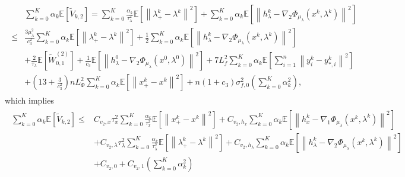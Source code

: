 \documentclass[10pt]{article}
\theoremstyle{remark}
\newcommand{\E}{\mathbb{E}}
\newcommand{\norm}[1]{\left\|#1\right\|}
\begin{document}
\begin{align}\label{ineq: tildeV_lam}
    \begin{aligned}
        &\sum_{k=0}^{K}\alpha_k\E\left[\tilde V_{k,2}\right] = \sum_{k=0}^{K}\frac{\alpha_k}{\tau_{\lambda}^2}\E\left[\norm{\lambda_+^k - \lambda^k}^2\right] + \sum_{k=0}^{K}\alpha_k\E\left[\norm{h_{\lambda}^k - \nabla_2\Phi_{\mu_{\lambda}}(x^k, \lambda^k)}^2\right]\\
        \leq & \frac{3\mu_{\lambda}^2}{c_3^2}\sum_{k=0}^{K}\alpha_k\E\left[\norm{\lambda_+^k - \lambda^k}^2\right] + \frac{1}{2}\sum_{k=0}^{K}\alpha_k\E\left[\norm{h_{\lambda}^k - \nabla_2\Phi_{\mu_{\lambda}}(x^k, \lambda^k)}^2\right] \\
        &+ \frac{2}{\tau_{\lambda}}\E\left[\tilde W_{0,1}^{(2)}\right] + \frac{1}{c_3}\E\left[\norm{h_{\lambda}^0 - \nabla_2\Phi_{\mu_{\lambda}}(x^0, \lambda^0)}^2\right] + 7L_f^2\sum_{k=0}^{K}\alpha_k\E\left[\sum_{i=1}^{n}\norm{y_i^k-y_{*,i}^k}^2\right] \\
        &+ \left(13 + \frac{3}{c_3^2}\right)nL_{\Phi}^2\sum_{k=0}^{K}\alpha_k\E\left[\norm{x_+^k - x^k}^2\right] + n(1 + c_3)\sigma_{f,0}^2\left(\sum_{k=0}^{K}\alpha_k^2\right),
    \end{aligned}
\end{align}
which implies
\begin{align}\label{ineq: tildeV_2_final}
    \begin{aligned}
        \sum_{k=0}^{K}\alpha_k\E\left[\tilde V_{k,2}\right] \leq &C_{v_2, x}\tau_x^2\sum_{k=0}^{K}\frac{\alpha_k}{\tau_x^2}\E\left[\norm{x_+^k - x^k}^2\right] + C_{v_2, h_x}\sum_{k=0}^{K}\alpha_k\E\left[\norm{h_x^k - \nabla_1\Phi_{\mu_{\lambda}}(x^k,\lambda^k)}^2\right] \\
        &+ C_{v_2, \lambda}\tau_{\lambda}^2\sum_{k=0}^{K}\frac{\alpha_k}{\tau_{\lambda}^2}\E\left[\norm{\lambda_+^k - \lambda^k}^2\right] +   C_{v_2, h_{\lambda}}\sum_{k=0}^{K}\alpha_k\E\left[\norm{h_{\lambda}^k - \nabla_2\Phi_{\mu_{\lambda}}(x^k, \lambda^k)}^2\right]  \\
        &+ C_{v_2, 0} + C_{v_2, 1}\left(\sum_{k=0}^{K}\alpha_k^2\right)
    \end{aligned}
\end{align}
\end{document}
